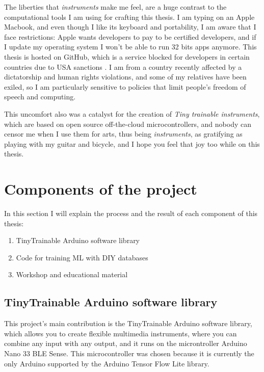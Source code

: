 The liberties that \emph{instruments} make me feel, are a huge contrast to the computational tools I am using for crafting this thesis. I am typing on an Apple Macbook, and even though I like its keyboard and portability, I am aware that I face restrictions: Apple wants developers to pay to be certified developers, and if I update my operating system I won't be able to run 32 bits apps anymore. This thesis is hosted on GitHub, which is a service blocked for developers in certain countries due to USA sanctions \cite{website-github-trade-controls}. I am from a country recently affected by a dictatorship and human rights violations, and some of my relatives have been exiled, so I am particularly sensitive to policies that limit people's freedom of speech and computing.

This uncomfort also was a catalyst for the creation of \textit{Tiny trainable instruments}, which are based on open source off-the-cloud microcontrollers, and nobody can censor me when I use them for arts, thus being \emph{instruments}, as gratifying as playing with my guitar and bicycle, and I hope you feel that joy too while on this thesis.

\section{Components of the project}

In this section I will explain the process and the result of each component of this thesis:

\begin{enumerate}
  \item TinyTrainable Arduino software library
  \item Code for training \acrshort{ML} with \acrshort{DIY} databases
  \item Workshop and educational material
\end{enumerate}

\subsection{TinyTrainable Arduino software library}

This project's main contribution is the TinyTrainable Arduino software library, which allows you to create flexible multimedia instruments, where you can combine any input with any output, and it runs on the microntroller Arduino Nano 33 BLE Sense. This microcontroller was chosen because it is currently the only Arduino supported by the Arduino Tensor Flow Lite library.

